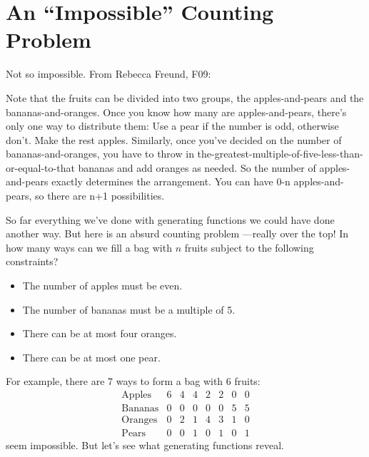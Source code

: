 \section{An ``Impossible'' Counting Problem}
\label{sec:impossible_counting}

\begin{editingnotes}

Not so impossible.  From Rebecca Freund, F09:

Note that the fruits can be divided into two groups, the apples-and-pears
and the bananas-and-oranges. Once you know how many are apples-and-pears,
there's only one way to distribute them: Use a pear if the number is odd,
otherwise don't. Make the rest apples. Similarly, once you've decided on
the number of bananas-and-oranges, you have to throw in
the-greatest-multiple-of-five-less-than-or-equal-to-that bananas and add
oranges as needed. So the number of apples-and-pears exactly determines
the arrangement. You can have 0-n apples-and-pears, so there are n+1
possibilities.

\end{editingnotes}

So far everything we've done with generating functions we could have
done another way.  But here is an absurd counting problem ---really
over the top!  In how many ways can we fill a bag with $n$ fruits
subject to the following constraints?

\begin{itemize}
\item The number of apples must be even.
\item The number of bananas must be a multiple of 5.
\item There can be at most four oranges.
\item There can be at most one pear.
\end{itemize}

For example, there are 7 ways to form a bag with 6 fruits:
%
\[
\begin{array}{c|ccccccc}
\text{Apples}  & 6 & 4 & 4 & 2 & 2 & 0 & 0 \\
\text{Bananas} & 0 & 0 & 0 & 0 & 0 & 5 & 5 \\
\text{Oranges} & 0 & 2 & 1 & 4 & 3 & 1 & 0 \\
\text{Pears}   & 0 & 0 & 1 & 0 & 1 & 0 & 1
\end{array}
\]
seem impossible.  But let's see what generating functions reveal.

